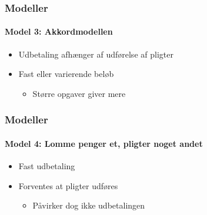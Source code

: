 \begin{frame}
\frametitle{Modeller}
\framesubtitle{\textbf{Model 3:} Akkordmodellen}
    \begin{itemize}
        \item{Udbetaling afhænger af udførelse af pligter}
        \item{Fast eller varierende beløb}
            \begin{itemize}
                \item{Større opgaver giver mere}
            \end{itemize}
    \end{itemize}
    \vspace{\baselineskip}
\end{frame}

\begin{frame}
\frametitle{Modeller}
\framesubtitle{\textbf{Model 4:} Lomme penger et, pligter noget andet}
    \begin{itemize}
        \item{Fast udbetaling}
        \item{Forventes at pligter udføres}
            \begin{itemize}
                \item{Påvirker dog ikke udbetalingen}
            \end{itemize}
    \end{itemize}    
    \vspace{\baselineskip}
\end{frame}

